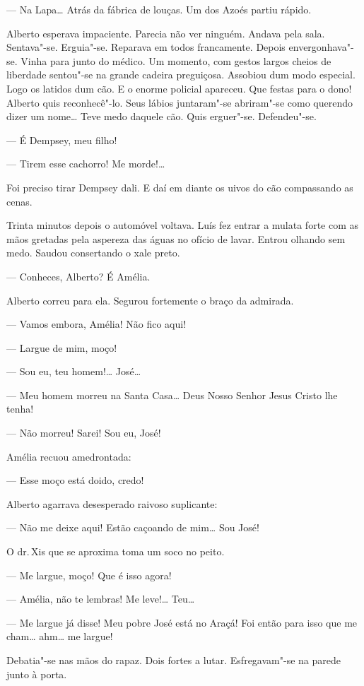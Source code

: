 --- Na Lapa\ldots{} Atrás da fábrica de louças. Um dos Azoés partiu rápido.

Alberto esperava impaciente. Parecia não ver ninguém. Andava pela sala.
Sentava"-se. Erguia"-se. Reparava em todos francamente. Depois
envergonhava"-se. Vinha para junto do médico. Um momento, com gestos
largos cheios de liberdade sentou"-se na grande cadeira preguiçosa.
Assobiou dum modo especial. Logo os latidos dum cão. E o enorme policial
apareceu. Que festas para o dono! Alberto quis reconhecê"-lo. Seus lábios
juntaram"-se abriram"-se como querendo dizer um nome\ldots{} Teve medo daquele
cão. Quis erguer"-se. Defendeu"-se.

--- É Dempsey, meu filho!

--- Tirem esse cachorro! Me morde!\ldots{}

Foi preciso tirar Dempsey dali. E daí em diante os uivos do cão
compassando as cenas.

Trinta minutos depois o automóvel voltava. Luís fez entrar a mulata
forte com as mãos gretadas pela aspereza das águas no ofício de lavar.
Entrou olhando sem medo. Saudou consertando o xale preto.

--- Conheces, Alberto? É Amélia.

Alberto correu para ela. Segurou fortemente o braço da admirada.

--- Vamos embora, Amélia! Não fico aqui!

--- Largue de mim, moço!

--- Sou eu, teu homem!\ldots{} José\ldots{}

--- Meu homem morreu na Santa Casa\ldots{} Deus Nosso Senhor Jesus Cristo lhe
tenha!

--- Não morreu! Sarei! Sou eu, José!

Amélia recuou amedrontada:

--- Esse moço está doido, credo!

Alberto agarrava desesperado raivoso suplicante:

--- Não me deixe aqui! Estão caçoando de mim\ldots{} Sou José!

O dr.\,Xis que se aproxima toma um soco no peito.

--- Me largue, moço! Que é isso agora!

--- Amélia, não te lembras! Me leve!\ldots{} Teu\ldots{}

--- Me largue já disse! Meu pobre José está no Araçá! Foi então para
isso que me cham\ldots{} ahm\ldots{} me largue!

Debatia"-se nas mãos do rapaz. Dois fortes a lutar. Esfregavam"-se na
parede junto à porta.

